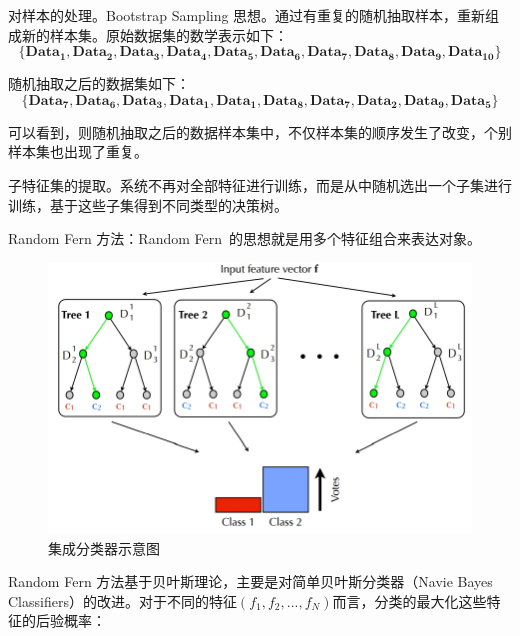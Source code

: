 对样本的处理。Bootstrap Sampling 思想。通过有重复的随机抽取样本，重新组成新的样本集。原始数据集的数学表示如下：
$$\mathbf{\{Dat}{{\mathbf{a}}_{\mathbf{1}}}\mathbf{,Dat}{{\mathbf{a}}_{\mathbf{2}}}\mathbf{,Dat}{{\mathbf{a}}_{\mathbf{3}}}\mathbf{,Dat}{{\mathbf{a}}_{\mathbf{4}}}\mathbf{,Dat}{{\mathbf{a}}_{\mathbf{5}}}\mathbf{,Dat}{{\mathbf{a}}_{\mathbf{6}}}\mathbf{,Dat}{{\mathbf{a}}_{\mathbf{7}}}\mathbf{,Dat}{{\mathbf{a}}_{\mathbf{8}}}\mathbf{,Dat}{{\mathbf{a}}_{\mathbf{9}}}\mathbf{,Dat}{{\mathbf{a}}_{\mathbf{10}}}\mathbf{\}}$$

随机抽取之后的数据集如下：
$$\mathbf{\{Dat}{{\mathbf{a}}_{\mathbf{7}}}\mathbf{,Dat}{{\mathbf{a}}_{\mathbf{6}}}\mathbf{,Dat}{{\mathbf{a}}_{\mathbf{3}}}\mathbf{,Dat}{{\mathbf{a}}_{\mathbf{1}}}\mathbf{,Dat}{{\mathbf{a}}_{\mathbf{1}}}\mathbf{,Dat}{{\mathbf{a}}_{\mathbf{8}}}\mathbf{,Dat}{{\mathbf{a}}_{\mathbf{7}}}\mathbf{,Dat}{{\mathbf{a}}_{\mathbf{2}}}\mathbf{,Dat}{{\mathbf{a}}_{\mathbf{9}}}\mathbf{,Dat}{{\mathbf{a}}_{\mathbf{5}}}\mathbf{\}}$$

可以看到，则随机抽取之后的数据样本集中，不仅样本集的顺序发生了改变，个别样本集也出现了重复。

子特征集的提取。系统不再对全部特征进行训练，而是从中随机选出一个子集进行训练，基于这些子集得到不同类型的决策树。


Random Fern 方法：Random Fern 的思想就是用多个特征组合来表达对象。


\begin{figure}[htb]   
	\centering
	\includegraphics[width=\textwidth]{figs/161002_Thesis_Tracking_Section_05.pdf}
	\caption{集成分类器示意图}
	\label{fig:161002_Thesis_Tracking_Section_05}
\end{figure}

Random Fern 方法基于贝叶斯理论，主要是对简单贝叶斯分类器（Navie Bayes Classifiers）的改进。对于不同的特征$(f_1, f_2, ..., f_N)$而言，分类的最大化这些特征的后验概率：

